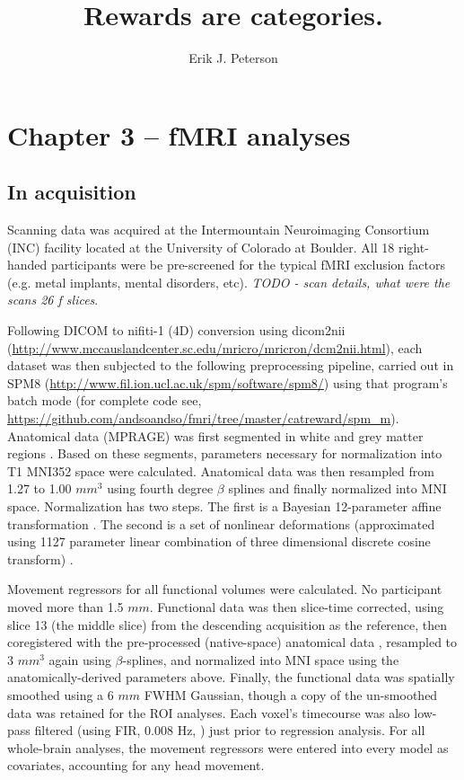 \documentclass[doc,12pt]{apa}        %
\title{Rewards are categories.}
\author{Erik J. Peterson} \affiliation{Dept. of Psychology \\ Colorado State University \\ Fort Collins, CO}
\begin{document}
 
\maketitle
\doublespacing

\section{Chapter 3 -- fMRI analyses} %
\label{sec:task_and_models}
\subsection{In acquisition}
\label{sub:acquired}
Scanning data was acquired at the Intermountain Neuroimaging Consortium (INC) facility located at the University of Colorado at Boulder.  All 18 right-handed participants were be pre-screened for the typical fMRI exclusion factors (e.g. metal implants, mental disorders, etc).  \emph{TODO - scan details, what were the scans 26 f slices}.  

Following DICOM to nifiti-1 (4D) conversion using dicom2nii (\url{http://www.mccauslandcenter.sc.edu/mricro/mricron/dcm2nii.html}), each dataset was then subjected to the following preprocessing pipeline, carried out in SPM8 (\url{http://www.fil.ion.ucl.ac.uk/spm/software/spm8/}) using that program's batch mode (for complete code see, \url{https://github.com/andsoandso/fmri/tree/master/catreward/spm\_m}).  Anatomical data (MPRAGE) was first segmented in white and grey matter regions \cite{Collignon:1995p9347}.  Based on these segments, parameters necessary for normalization into T1 MNI352 space were calculated.  Anatomical data was then resampled from 1.27 to 1.00 $mm^3$ using fourth degree $\beta$ splines and finally normalized into MNI space.  Normalization has two steps.  The first is a Bayesian 12-parameter affine transformation \cite{Ashburner:1997p9348}.  The second is a set of nonlinear deformations (approximated using 1127 parameter linear combination of three dimensional discrete cosine transform) \cite{Ashburner:1999p9350}. 

Movement regressors for all functional volumes were calculated.  No participant moved more than 1.5 $mm$. Functional data was then slice-time corrected, using slice 13 (the middle slice) from the descending acquisition as the reference, then coregistered with the pre-processed (native-space) anatomical data \cite{Collignon:1995p9347}, resampled to 3 $mm^3$ again using $\beta$-splines, and normalized into MNI space using the anatomically-derived parameters above.  Finally, the functional data was spatially smoothed using a 6 $mm$ FWHM Gaussian, though a copy of the un-smoothed data was retained for the ROI analyses.  Each voxel's timecourse was also low-pass filtered (using FIR, 0.008 Hz, \cite{Kruggel:1999p9351}) just prior to regression analysis.  For all whole-brain analyses, the movement regressors were entered into every model as covariates, accounting for any head movement.
\end{document}

